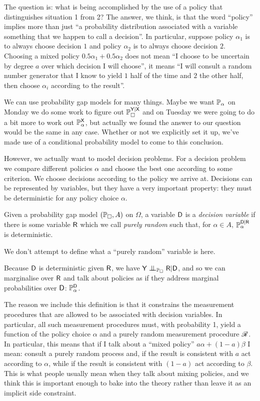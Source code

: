 The question is: what is being accomplished by the use of a policy that distinguishes situation 1 from 2? The answer, we think, is that the word ``policy'' implies more than just ``a probability distribution associated with a variable something that we happen to call a decision''. In particular, suppose policy $\alpha_1$ is to always choose decision $1$ and policy $\alpha_2$ is to always choose decision $2$. Choosing a mixed policy $0.5\alpha_1 + 0.5\alpha_2$ does not mean ``I choose to be uncertain by degree $a$ over which decision I will choose'', it means ``I will consult a random number generator that I know to yield $1$ half of the time and $2$ the other half, then choose $\alpha_i$ according to the result''. 



We can use probability gap models for many things. Maybe we want $\mathbb{P}_\alpha$ on Monday we do some work to figure out $\mathbb{P}_\square^{\mathsf{Y}|\mathsf{X}}$ and on Tuesday we were going to do a bit more to work out $\mathbb{P}_\alpha^{\mathsf{X}}$, but actually we found the answer to our question would be the same in any case. Whether or not we explicitly set it up, we've made use of a conditional probability model to come to this conclusion.

However, we actually want to model decision problems. For a decision problem we compare different policies $\alpha$ and choose the best one according to some criterion. We choose decisions according to the policy we arrive at. Decisions can be represented by variables, but they have a very important property: they must be deterministic for any policy choice $\alpha$.

\begin{definition}
Given a probability gap model $(\mathbb{P}_\square, A)$ on $\Omega$, a variable $\mathsf{D}$ is a \emph{decision variable} if there is some variable $\mathsf{R}$ which we call \emph{purely random} such that, for $\alpha\in A$, $\mathbb{P}_\alpha^{\mathsf{D}|\mathsf{R}}$ is deterministic.
\end{definition}

We don't attempt to define what a ``purely random'' variable is here.

Because $\mathsf{D}$ is deterministic given $\mathsf{R}$, we have $\RV{Y}\CI_{\prob{P}_\square}\RV{R}|\RV{D}$, and so we can marginalise over $\mathsf{R}$ and talk about policies as if they address marginal probabilities over $\mathsf{D}$: $\mathbb{P}_\alpha^{\mathsf{D}}$.

The reason we include this definition is that it constrains the measurement procedures that are allowed to be associated with decision variables. In particular, all such measurement procedures must, with probability 1, yield a function of the policy choice $\alpha$ and a purely random measurement procedure $\mathscr{R}$. In particular, this means that if I talk about a ``mixed policy'' $a\alpha+(1-a)\beta$ I mean: consult a purely random process and, if the result is consistent with $a$ act according to $\alpha$, while if the result is consistent with $(1-a)$ act according to $\beta$. This is what people usually mean when they talk about mixing policies, and we think this is important enough to bake into the theory rather than leave it as an implicit side constraint.

